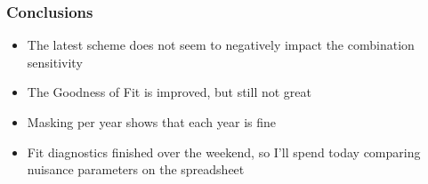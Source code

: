 \documentclass{beamer}
\newcommand{\beginbackup}{
  \newcounter{framenumbervorappendix}
  \setcounter{framenumbervorappendix}{\value{framenumber}}
}
\newcommand{\backupend}{
  \addtocounter{framenumbervorappendix}{-\value{framenumber}}
  \addtocounter{framenumber}{\value{framenumbervorappendix}}
}
\begin{document}
\begin{frame}
  \frametitle{Conclusions}

  \begin{itemize}
  \item The latest scheme does not seem to negatively impact the combination sensitivity
  \item The Goodness of Fit is improved, but still not great
  \item Masking per year shows that each year is fine
  \item Fit diagnostics finished over the weekend,
    so I'll spend today comparing nuisance parameters on the spreadsheet
  \end{itemize}

\end{frame}

\begin{comment}
\beginbackup

\begin{frame}
  \centering
    {\Huge \bf\sffamily Backup Slides}
\end{frame}



\backupend
\end{comment}
\end{document}
